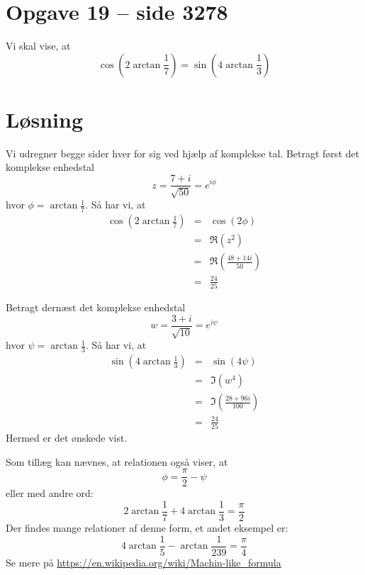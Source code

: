 \documentclass[12pt,oneside,a4paper]{article}
\newcommand{\bas}{\begin{eqnarray*}}
\newcommand{\eas}{\end{eqnarray*}}
\begin{document}
\section*{Opgave 19 -- side 3278}
Vi skal vise, at
$$
\cos\left(2\arctan\frac17\right) = \sin\left(4\arctan\frac13\right)
$$

\section*{Løsning}
Vi udregner begge sider hver for sig ved hjælp af komplekse tal. Betragt først
det komplekse enhedstal
$$
z = \frac{7+i}{\sqrt{50}} = e^{i\phi}
$$
hvor $\phi = \arctan\frac17$. Så har vi, at 
\bas
\cos\left(2\arctan\frac17\right) &=&
\cos(2\phi) \\
&=& \Re(z^2) \\
&=& \Re\left(\frac{48+14i}{50}\right) \\
&=& \frac{24}{25}
\eas

Betragt dernæst det komplekse enhedstal
$$
w = \frac{3+i}{\sqrt{10}} = e^{i\psi}
$$
hvor $\psi = \arctan\frac13$. Så har vi, at
\bas
\sin\left(4\arctan\frac13\right) &=& \sin(4\psi) \\
                                 &=& \Im(w^4) \\
                                 &=& \Im\left(\frac{28+96i}{100}\right) \\
                                 &=& \frac{24}{25}
\eas
Hermed er det ønskede vist.

Som tillæg kan nævnes, at relationen også viser, at 
$$
\phi = \frac{\pi}{2} - \psi
$$
eller med andre ord:
$$
2\arctan\frac17 + 4\arctan\frac13 = \frac{\pi}{2}
$$
Der findes mange relationer af denne form, et andet eksempel er:
$$
4\arctan\frac15 - \arctan\frac{1}{239} = \frac{\pi}{4}
$$
Se mere på \url{https://en.wikipedia.org/wiki/Machin-like_formula}
\end{document}
